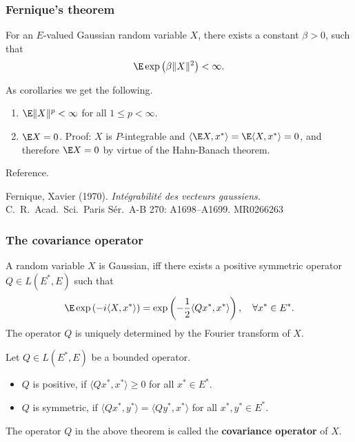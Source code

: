 \begin{frame}
    \frametitle{Fernique's theorem}

    \begin{theorem}
        For an $E$-valued Gaussian random variable $X$, there exists a constant
        $\beta>0$, such that
        \begin{equation*}
            \E \exp \left( \beta \| X \|^2 \right) < \infty.
        \end{equation*}
    \end{theorem}


    As corollaries we get the following. 

    \begin{enumerate}
        \item $\E \| X \|^p < \infty$ for all $1 \leq p < \infty$. 
        \item $\E X=0$. \textsf{Proof:} $X$ is $P$-integrable and 
            $\langle \E X,x^* \rangle= \E \langle X,x^* \rangle=0$, and
            therefore $\E X=0$ by virtue of the Hahn-Banach theorem.
    \end{enumerate}
   
    Reference. 
    
    Fernique, Xavier (1970). \emph{Intégrabilité des vecteurs gaussiens.} C.\ R.\
    Acad.\ Sci.\ Paris Sér.\ A-B 270: A1698–A1699. MR0266263 
\end{frame}


\begin{frame}
    \frametitle{The covariance operator}
    
    \begin{theorem}
        A random variable $X$ is Gaussian, iff there exists a positive symmetric
        operator $Q\in L(E^*, E)$ such that
        \begin{equation*}
            \E \exp \left( -i \langle X, x^* \rangle \right) = 
            \exp\left( - \frac{1}{2} \langle Qx^*, x^* \rangle \right), \quad \forall x^*\in E^*.
        \end{equation*}
        The operator $Q$ is uniquely determined by the Fourier transform of $X$. 
    \end{theorem}

    Let $Q \in L(E^*, E)$ be a bounded operator.
    \begin{itemize}
        \item $Q$ is positive, if $\langle Qx^*, x^* \rangle \geq 0$ for all $x^* \in E^*$.
        \item $Q$ is symmetric, if $\langle Qx^*, y^* \rangle = \langle Qy^*, x^* \rangle$
            for all $x^*, y^* \in E^*$. 
    \end{itemize}

    The operator $Q$ in the above theorem is called the \textbf{covariance operator}
    of $X$. 
\end{frame}


